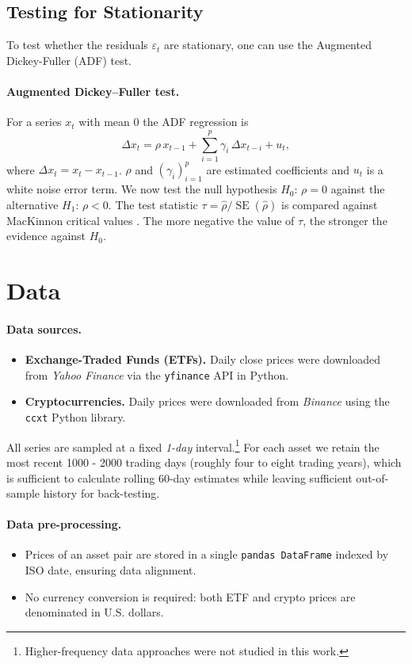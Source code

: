 \documentclass{article}
\begin{document}
\subsection{Testing for Stationarity}\label{sec:testing_for_stationarity}
To test whether the residuals \(\varepsilon_t\) are stationary, one can use the Augmented Dickey-Fuller (ADF) test.
\paragraph{Augmented Dickey--Fuller test.}
For a series $x_t$ with mean 0 the ADF regression is
\[
\Delta x_t = \rho\,x_{t-1} + \sum_{i=1}^{p}\gamma_i\,\Delta x_{t-i} + u_t ,
\]
where $\Delta x_t = x_t - x_{t-1}$. $\rho$ and $\left(\gamma_i\right)_{i=1}^{p}$ are estimated coefficients and $u_t$ is a white noise error term.
We now test the null hypothesis $H_0:\,\rho = 0$ against the alternative $H_1:\,\rho < 0$.
The test statistic
\(
\tau = \hat{\rho}/\operatorname{SE}(\hat{\rho})
\)
is compared against MacKinnon critical values \parencite{MacKinnon2010CriticalValues}. The more negative the value of \(\tau\), the stronger the evidence against \(H_0\).
\newpage

\section{Data}
\paragraph{Data sources.}
\begin{itemize}
  \item \textbf{Exchange-Traded Funds (ETFs).}  Daily close prices were downloaded from \emph{Yahoo Finance} \parencite{yfinance} via the \texttt{yfinance} API in Python.
  \item \textbf{Cryptocurrencies.}  Daily prices were downloaded from \emph{Binance} \parencite{binance} using the \texttt{ccxt} Python library.
\end{itemize}
All series are sampled at a fixed \emph{1-day} interval.\footnote{Higher-frequency data approaches were not studied in this work.} For each asset we retain the most recent
1000 - 2000 trading days (roughly four to eight trading years), which is sufficient to calculate rolling 60-day estimates while leaving sufficient out-of-sample history for back-testing.
\paragraph{Data pre-processing.}
\begin{itemize}
    \item Prices of an asset pair are stored in a single \texttt{pandas DataFrame} indexed by ISO date, ensuring data alignment.
    \item No currency conversion is required: both ETF and crypto prices are denominated in U.S. dollars.
\end{itemize}
\end{document}
